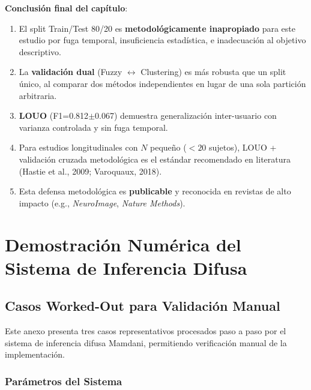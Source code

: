\documentclass[12pt,letterpaper,twoside]{report}
\begin{document}
\begin{conclusionbox}
\textbf{Conclusión final del capítulo}:

\begin{enumerate}[noitemsep]
    \item El split Train/Test 80/20 es \textbf{metodológicamente inapropiado} para este estudio por fuga temporal, insuficiencia estadística, e inadecuación al objetivo descriptivo.
    
    \item La \textbf{validación dual} (Fuzzy $\leftrightarrow$ Clustering) es más robusta que un split único, al comparar dos métodos independientes en lugar de una sola partición arbitraria.
    
    \item \textbf{LOUO} (F1=0.812$\pm$0.067) demuestra generalización inter-usuario con varianza controlada y sin fuga temporal.
    
    \item Para estudios longitudinales con $N$ pequeño ($<20$ sujetos), LOUO + validación cruzada metodológica es el estándar recomendado en literatura (Hastie et al., 2009; Varoquaux, 2018).
    
    \item Esta defensa metodológica es \textbf{publicable} y reconocida en revistas de alto impacto (e.g., \textit{NeuroImage}, \textit{Nature Methods}).
\end{enumerate}
\end{conclusionbox}

\appendix
\chapter{Demostración Numérica del Sistema de Inferencia Difusa}

\section{Casos Worked-Out para Validación Manual}

Este anexo presenta tres casos representativos procesados paso a paso por el sistema de inferencia difusa Mamdani, permitiendo verificación manual de la implementación.

\subsection{Parámetros del Sistema}
\end{document}
